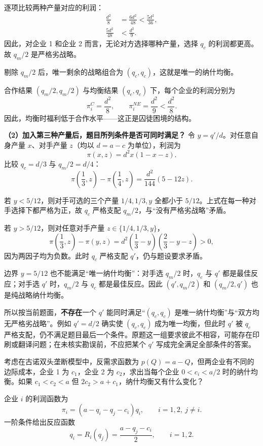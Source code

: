 逐项比较两种产量对应的利润：
\begin{align*}
  \frac{d^2}{8}&=\frac{6d^2}{48}<\frac{5d^2}{36},\\
  \frac{5d^2}{48}&<\frac{d^2}{9}.
\end{align*}\indent
因此，对企业 1 和企业 2 而言，无论对方选择哪种产量，选择 $q_c$ 的利润都更高。故 $q_m/2$ 是严格劣战略。

剔除 $q_m/2$ 后，唯一剩余的战略组合为 $(q_c,q_c)$，这就是唯一的纳什均衡。

合作结果 $(q_m/2,q_m/2)$ 与均衡结果 $(q_c,q_c)$ 下，每个企业的利润分别为
\[
  \pi_i^{C}=\frac{d^2}{8},\qquad
  \pi_i^{NE}=\frac{d^2}{9}<\frac{d^2}{8}.
\]
\indent 因此，均衡时福利低于合作水平——这正是囚徒困境的结构。

\textbf{（2）加入第三种产量后，题目所列条件是否可同时满足？} 令 $y=q'/d$。对任意自身产量 $x$、对手产量 $z$（均以 $d=a-c$ 为单位），利润为
\[
  \pi(x,z)=d^2x(1-x-z).
\]\indent
比较 $q_c=d/3$ 与 $q_m/2=d/4$：
\[
  \pi\!\left(\frac13,z\right)-\pi\!\left(\frac14,z\right)
  =\frac{d^2}{144}(5-12z).
\]

若 $y<5/12$，则对手可选的三个产量 $1/4,1/3,y$ 全都小于 $5/12$。上式在每一种对手选择下都严格为正，故 $q_c$ 严格支配 $q_m/2$，与“没有严格劣战略”矛盾。

若 $y>5/12$，则对任意对手产量 $z\in\{1/4,1/3,y\}$，
\[
  \pi\!\left(\frac13,z\right)-\pi(y,z)
  =d^2\left(\frac13-y\right)\left(\frac23-y-z\right)>0,
\]\indent
因为两因子均为负数。此时 $q_c$ 严格支配 $q'$，仍与题设要求矛盾。

边界 $y=5/12$ 也不能满足“唯一纳什均衡”：对手选 $q_m/2$ 时，$q_c$ 与 $q'$ 都是最佳反应；对手选 $q'$ 时，$q_m/2$ 与 $q_c$ 都是最佳反应。因此 $(q',q_m/2)$ 和 $(q_m/2,q')$ 也是纯战略纳什均衡。

所以按当前题面，\textbf{不存在}一个 $q'$ 能同时满足“$(q_c,q_c)$ 是唯一纳什均衡”与“双方均无严格劣战略”。例如 $q'=d/2$ 确实使 $(q_c,q_c)$ 成为唯一均衡，但此时 $q'$ 被 $q_c$ 严格支配，仍不满足题目最后一个条件。原题这一组要求彼此不相容，可能存在印刷或翻译问题；在未核实勘误前，不应把某个 $q'$ 写成完全满足全部条件的答案。

考虑在古诺双头垄断模型中，反需求函数为 $p(Q)=a-Q$，但两企业有不同的边际成本，企业 1 为 $c_1$，企业 2 为 $c_2$，求出当每个企业 $0<c_i<a/2$ 时的纳什均衡。如果 $c_1<c_2<a$ 但 $2c_2>a+c_1$，纳什均衡又有什么变化？

\sol
企业 $i$ 的利润函数为
\[
  \pi_i=(a-q_i-q_j-c_i)q_i,\qquad i=1,2,\ j\ne i.
\]\indent
一阶条件给出反应函数
\[
  q_i=R_i(q_j)=\frac{a-q_j-c_i}{2},\qquad i=1,2.
\]

